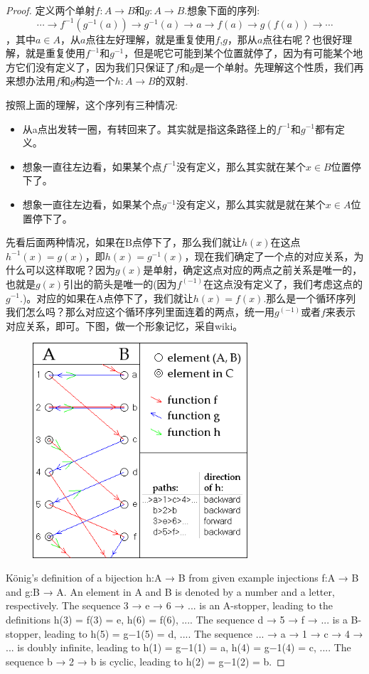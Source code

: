 \documentclass{article}
\newcommand*{\xfunc}[4]{{#2}\colon{#3}{#1}{#4}}
\newcommand*{\func}[3]{\xfunc{\to}{#1}{#2}{#3}}
\begin{document}
\begin{proof}
定义两个单射$\func{f}{A}{B}$和$\func{g}{A}{B}$.想象下面的序列:\[\cdots \rightarrow  f^{-1}(g^{-1}(a)) \rightarrow g^{-1}(a) \rightarrow   a  \rightarrow  f(a) \rightarrow  g(f(a)) \rightarrow \cdots\]，其中$a \in A$，从$a$点往左好理解，就是重复使用$f$,$g$，那从$a$点往右呢？也很好理解，就是重复使用$f^{-1}$和$g^{-1}$，但是呢它可能到某个位置就停了，因为有可能某个地方它们没有定义了，因为我们只保证了$f$和$g$是一个单射。先理解这个性质，我们再来想办法用$f$和$g$构造一个$\func{h}{A}{B}$的双射.

按照上面的理解，这个序列有三种情况:
\begin{itemize}
	\item 从a点出发转一圈，有转回来了。其实就是指这条路径上的$f^{-1}$和$g^{-1}$都有定义。
	\item 想象一直往左边看，如果某个点$f^{-1}$没有定义，那么其实就在某个$x \in B$位置停下了。
	\item 想象一直往左边看，如果某个点$g^{-1}$没有定义，那么其实就是就在某个$x \in A$位置停下了。	
\end{itemize}

先看后面两种情况，如果在B点停下了，那么我们就让$h(x)$在这点$h^{-1}(x)=g(x)$，即$h(x)=g^{-1}(x)$，现在我们确定了一个点的对应关系，为什么可以这样取呢？因为$g(x)$是单射，确定这点对应的两点之前关系是唯一的，也就是$g(x)$引出的箭头是唯一的(因为$f^(-1)$在这点没有定义了，我们考虑这点的$g^{-1}$.)。对应的如果在A点停下了，我们就让$h(x)=f(x)$.那么是一个循环序列我们怎么吗？那么对应这个循环序列里面连着的两点，统一用$g^(-1)$或者$f$来表示对应关系，即可。下图，做一个形象记忆，采自wiki。

\begin{center}
\includegraphics[width=10cm, height=8cm]{images/Cantor-Bernstein.png}
\end{center}

König's definition of a bijection h:A → B from given example injections f:A → B and g:B → A. An element in A and B is denoted by a number and a letter, respectively. The sequence 3 → e → 6 → ... is an A-stopper, leading to the definitions h(3) = f(3) = e, h(6) = f(6), .... The sequence d → 5 → f → ... is a B-stopper, leading to h(5) = g−1(5) = d, .... The sequence ... → a → 1 → c → 4 → ... is doubly infinite, leading to h(1) = g−1(1) = a, h(4) = g−1(4) = c, .... The sequence b → 2 → b is cyclic, leading to h(2) = g−1(2) = b.

\end{proof}
\end{document}

